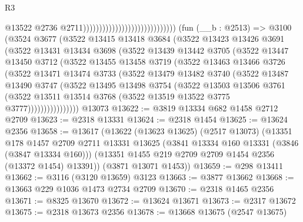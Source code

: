 \begin{lexlean}{R3}
\begin{coremodule}
                                                              @13522
                                                              @2736
                                                              @2711)))))))))))))))))))))))))))))
    (fun (__b : @2513) =>
    @3100
      (@3524
        @3677
        (@3522
          @13415
          @13418
          @3684
          (@3522
            @13423
            @13426
            @3691
            (@3522
              @13431
              @13434
              @3698
              (@3522
                @13439
                @13442
                @3705
                (@3522
                  @13447
                  @13450
                  @3712
                  (@3522
                    @13455
                    @13458
                    @3719
                    (@3522
                      @13463
                      @13466
                      @3726
                      (@3522
                        @13471
                        @13474
                        @3733
                        (@3522
                          @13479
                          @13482
                          @3740
                          (@3522
                            @13487
                            @13490
                            @3747
                            (@3522
                              @13495
                              @13498
                              @3754
                              (@3522
                                @13503
                                @13506
                                @3761
                                (@3522
                                  @13511
                                  @13514
                                  @3768
                                  (@3522 @13519 @13522 @3775 @3777))))))))))))))))
    @13073
@13622 := @3819 @13334 @682 @1458 @2712 @2709
@13623 := @2318 @13331
@13624 := @2318 @1454
@13625 := @13624 @2356
@13658 := @13617
    (@13622
      (@13623 @13625)
      (@2517 @13073)
      (@13351
        @178
        @1457
        @2709
        @2711
        @13331
        @13625
        (@3841 @13334 @160 @13331 (@3846 (@3847 @13334 @160)))
        (@13351 @1455 @219 @2709 @2709 @1454 @2356 (@13372 @1454) @13391))
      (@3871 @13071 @1453))
@13659 := @298 @13411
@13662 := @3116 (@3120 @13659) @3123
@13663 := @3877 @13662
@13668 := @13663 @229 @1036 @1473 @2734 @2709
@13670 := @2318 @1465 @2356
@13671 := @8325 @13670
@13672 := @13624 @13671
@13673 := @2317 @13672
@13675 := @2318 @13673 @2356
@13678 := @13668 @13675 (@2547 @13675)

\end{coremodule}
\end{lexlean}
